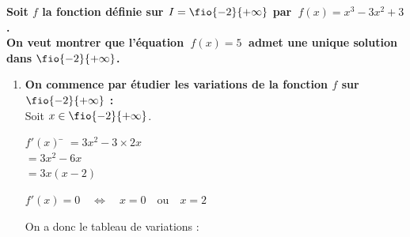\documentclass[a4paper,11pt,cours]{nsi} %
\begin{document}
\begin{methode}
	\textbf{Soit $f$ la fonction définie sur $I=\fio{-2}{+\infty}$ par $\ f(x)=x^3-3x^2+3$.\\
	On veut montrer que l'équation $\ f(x)=5\ $ admet une unique solution dans $\fio{-2}{+\infty}$.}

	\begin{enumerate}[label=\textbullet]
		\item \textbf{On commence par étudier les variations de la fonction $f$ sur $\fio{-2}{+\infty}$ :}\\[.5em]
		Soit $x\in \fio{-2}{+\infty}$.
		\begin{multicols}{2}
			\begin{tabbing}
				$f'(x)$ \= $=3x^2-3\times 2x$\\
				 \>	$= 3x^2-6x$\\
				 \> $=3x(x-2)$
			\end{tabbing}

			$f'(x)=0 \quad \iff \quad x=0\quad \text{ou}\quad x=2$
		\end{multicols}
		On a donc le tableau de variations :
		\begin{center}
			\end{center}
		   

\end{enumerate}
\end{methode}
\end{document}

